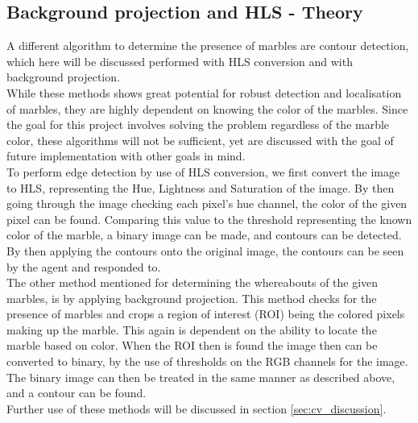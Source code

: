 \documentclass[../../../../main.tex]{subfiles}
\begin{document}
\subsection{Background projection and HLS - Theory}
\label{sec:cv_cont_bgp_theory}
A different algorithm to determine the presence of marbles are contour detection, 
which here will be discussed performed with HLS conversion and with background projection.\\

While these methods shows great potential for robust detection and localisation of marbles, they are highly dependent on knowing the color of the marbles.
Since the goal for this project involves solving the problem regardless of the marble color, these algorithms will not be sufficient, 
yet are discussed with the goal of future implementation with other goals in mind.\\

To perform edge detection by use of HLS conversion, we first convert the image to HLS, representing the Hue, Lightness and Saturation of the image.
By then going through the image checking each pixel's hue channel, the color of the given pixel can be found. 
Comparing this value to the threshold representing the known color of the marble, a binary image can be made, and contours can be detected.
By then applying the contours onto the original image, the contours can be seen by the agent and responded to.\\
The other method mentioned for determining the whereabouts of the given marbles, 
is by applying background projection. This method checks for the presence of marbles and crops a region of interest (ROI) being the colored pixels making up the marble.
This again is dependent on the ability to locate the marble based on color. When the ROI then is found the image then can be converted to binary, by the use of thresholds on the RGB channels for the image. The binary image can then be treated in the same manner as described above, and a contour can be found.\\
Further use of these methods will be discussed in section \ref{sec:cv_discussion}.
\end{document}

